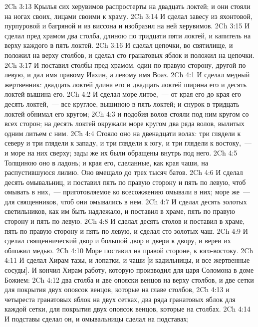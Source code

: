 \vs 2Ch 3:13 Крылья сих херувимов  распростерты на двадцать локтей; и они стояли на ногах своих, лицами своими к храму.
\vs 2Ch 3:14 И сделал завесу из яхонтовой, пурпуровой и багряной  и из виссона и изобразил на ней херувимов.
\vs 2Ch 3:15 И сделал пред храмом два столба, длиною по тридцати пяти локтей, и капитель на верху каждого в пять локтей.
\vs 2Ch 3:16 И сделал цепочки,  во святилище, и положил на верху столбов, и сделал сто гранатовых яблок и положил на цепочки.
\vs 2Ch 3:17 И поставил столбы пред храмом, один по правую сторону, другой по левую, и дал имя правому Иахин, а левому имя Воаз.
\vs 2Ch 4:1 И сделал медный жертвенник: двадцать локтей длина его и двадцать локтей ширина его и десять локтей вышина его.
\vs 2Ch 4:2 И сделал море литое,~--- от края его до края его десять локтей,~--- все круглое, вышиною в пять локтей; и снурок в тридцать локтей обнимал его кругом;
\vs 2Ch 4:3 и  подобия волов стояли под ним кругом со всех сторон; на десять локтей окружали море кругом два ряда волов, вылитых одним литьем с ним.
\vs 2Ch 4:4 Стояло оно на двенадцати волах: три глядели к северу и три глядели к западу, и три глядели к югу, и три глядели к востоку,~--- и море на них сверху; зады же их были обращены внутрь под него.
\vs 2Ch 4:5 Толщиною оно  в ладонь; и края его, сделанные, как края чаши,  на распустившуюся лилию. Оно вмещало до трех тысяч батов.
\vs 2Ch 4:6 И сделал десять омывальниц, и поставил пять по правую сторону и пять по левую, чтоб омывать в них,~--- приготовляемое ко всесожжению омывали в них; море же~--- для священников, чтоб они омывались в нем.
\vs 2Ch 4:7 И сделал десять золотых светильников, как им быть надлежало, и поставил в храме, пять по правую сторону и пять по левую.
\vs 2Ch 4:8 И сделал десять столов и поставил в храме, пять по правую сторону и пять по левую, и сделал сто золотых чаш.
\vs 2Ch 4:9 И сделал священнический двор и большой двор и двери к двору, и вереи их обложил медью.
\vs 2Ch 4:10 Море поставил на правой стороне, к юго-востоку.
\vs 2Ch 4:11 И сделал Хирам тазы, и лопатки, и чаши [и кадильницы, и все жертвенные сосуды]. И кончил Хирам работу, которую производил для царя Соломона в доме Божием:
\vs 2Ch 4:12 два столба и две опояски венцов на верху столбов, и две сетки для покрытия двух опоясок венцов, которые на главе столбов,
\vs 2Ch 4:13 и четыреста гранатовых яблок на двух сетках, два ряда гранатовых яблок для каждой сетки, для покрытия двух опоясок венцов, которые на столбах.
\vs 2Ch 4:14 И подставы сделал он, и омывальницы сделал на подставах;
